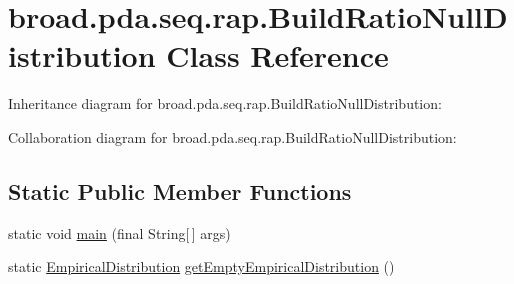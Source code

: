 \hypertarget{classbroad_1_1pda_1_1seq_1_1rap_1_1_build_ratio_null_distribution}{\section{broad.\+pda.\+seq.\+rap.\+Build\+Ratio\+Null\+Distribution Class Reference}
\label{classbroad_1_1pda_1_1seq_1_1rap_1_1_build_ratio_null_distribution}
}


Inheritance diagram for broad.\+pda.\+seq.\+rap.\+Build\+Ratio\+Null\+Distribution\+:


Collaboration diagram for broad.\+pda.\+seq.\+rap.\+Build\+Ratio\+Null\+Distribution\+:
\subsection*{Static Public Member Functions}
\begin{DoxyCompactItemize}
\item 
static void \hyperlink{classbroad_1_1pda_1_1seq_1_1rap_1_1_build_ratio_null_distribution_a993b3adaa01e6ca8236d95242b9f9482}{main} (final String\mbox{[}$\,$\mbox{]} args)
\item 
static \hyperlink{classbroad_1_1core_1_1math_1_1_empirical_distribution}{Empirical\+Distribution} \hyperlink{classbroad_1_1pda_1_1seq_1_1rap_1_1_build_ratio_null_distribution_ab77aff24273c3f5aef0f719f669ea1be}{get\+Empty\+Empirical\+Distribution} ()
\end{DoxyCompactItemize}
